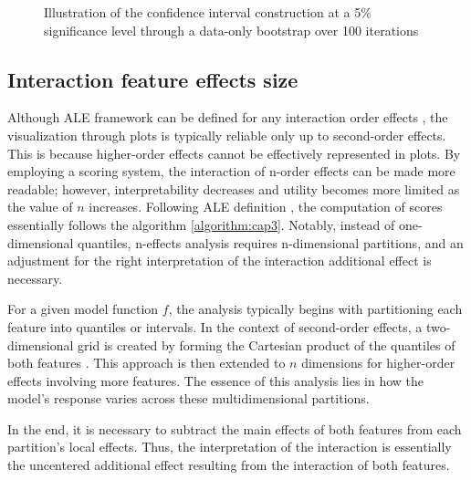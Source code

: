 \begin{figure}[ht!]
\centering
  \caption{Illustration of the confidence interval construction at a 5\% significance level through a data-only bootstrap over 100 iterations}
    \label{fig:bootstrap_no_full}
\end{figure}

\subsection{Interaction feature effects size}

Although \gls{ALE} framework can be defined for any interaction order effects \cite{Apley2020VisualizingModels}, the visualization through plots is typically reliable only up to second-order effects. This is because higher-order effects cannot be effectively represented in plots. By employing a scoring system, the interaction of n-order effects can be made more readable; however, interpretability decreases and utility becomes more limited as the value of \(n\) increases. Following \gls{ALE} definition \cite{Apley2020VisualizingModels}, the computation of scores essentially follows the algorithm \ref{algorithm:cap3}. Notably, instead of one-dimensional quantiles, n-effects analysis requires n-dimensional partitions, and an adjustment for the right interpretation of the interaction additional effect is necessary.

For a given model function \(f\), the analysis typically begins with partitioning each feature into quantiles or intervals. In the context of second-order effects, a two-dimensional grid is created by forming the Cartesian product of the quantiles of both features \cite{Apley2020VisualizingModels}. This approach is then extended to \(n\) dimensions for higher-order effects involving more features. The essence of this analysis lies in how the model's response varies across these multidimensional partitions. 

In the end, it is necessary to subtract the main effects of both features from each partition's local effects. Thus, the interpretation of the interaction is essentially the uncentered additional effect resulting from the interaction of both features.
